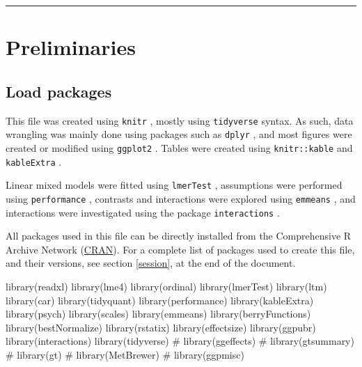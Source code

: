\documentclass[
  bookmarksnumbered]{article}
\newenvironment{Shaded}{\begin{snugshade}}{\end{snugshade}}
\newcommand{\CommentTok}[1]{\textcolor[rgb]{0.50,0.62,0.50}{#1}}
\newcommand{\FunctionTok}[1]{\textcolor[rgb]{0.94,0.94,0.56}{#1}}
\newcommand{\NormalTok}[1]{\textcolor[rgb]{0.80,0.80,0.80}{#1}}
\begin{document}
\par
\endgroup

{\hypersetup{hidelinks}
\setcounter{tocdepth}{6}
\tableofcontents
}
\opensupplement

\begin{center}\rule{0.5\linewidth}{0.5pt}\end{center}

\section{Preliminaries}\label{preliminaries}

\subsection{Load packages}\label{load-packages}

This file was created using \texttt{knitr} \autocite{knitrcit}, mostly using \texttt{tidyverse} \autocite{tidyversecit} syntax. As such, data wrangling was mainly done using packages such as \texttt{dplyr} \autocite{dplyrcit}, and most figures were created or modified using \texttt{ggplot2} \autocite{ggplotcit}. Tables were created using \texttt{knitr::kable} and \texttt{kableExtra} \autocite{kableExtracit}.

Linear mixed models were fitted using \texttt{lmerTest} \autocite{lmertestcit}, assumptions were performed using \texttt{performance} \autocite{ludecke2021}, contrasts and interactions were explored using \texttt{emmeans} \autocite{emmeanscit}, and interactions were investigated using the package \texttt{interactions} \autocite{interactionscit}.

All packages used in this file can be directly installed from the Comprehensive R Archive Network (\href{https://cran.r-project.org/}{CRAN}). For a complete list of packages used to create this file, and their versions, see section \ref{session}, at the end of the document.

\begin{Shaded}
\begin{Highlighting}[]
\FunctionTok{library}\NormalTok{(readxl)}
\FunctionTok{library}\NormalTok{(lme4)}
\FunctionTok{library}\NormalTok{(ordinal)}
\FunctionTok{library}\NormalTok{(lmerTest)}
\FunctionTok{library}\NormalTok{(ltm)}
\FunctionTok{library}\NormalTok{(car)}
\FunctionTok{library}\NormalTok{(tidyquant)}
\FunctionTok{library}\NormalTok{(performance)}
\FunctionTok{library}\NormalTok{(kableExtra)}
\FunctionTok{library}\NormalTok{(psych)}
\FunctionTok{library}\NormalTok{(scales)}
\FunctionTok{library}\NormalTok{(emmeans)}
\FunctionTok{library}\NormalTok{(berryFunctions)}
\FunctionTok{library}\NormalTok{(bestNormalize)}
\FunctionTok{library}\NormalTok{(rstatix)}
\FunctionTok{library}\NormalTok{(effectsize)}
\FunctionTok{library}\NormalTok{(ggpubr)}
\FunctionTok{library}\NormalTok{(interactions)}
\FunctionTok{library}\NormalTok{(tidyverse)}
\CommentTok{\# library(ggeffects)}
\CommentTok{\# library(gtsummary)}
\CommentTok{\# library(gt)}
\CommentTok{\# library(MetBrewer)}
\CommentTok{\# library(ggpmisc)}
\end{Highlighting}
\end{Shaded}
\end{document}
